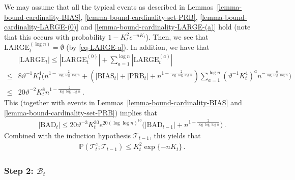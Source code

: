 \documentclass[11pt]{article}
\numberwithin{equation}{section}
\begin{document}
We may assume that all the typical events as described in Lemmas~\ref{lemma-bound-cardinality-BIAS}, \ref{lemma-bound-cardinality-set-PRB}, \ref{lemma-bound-cardinality-LARGE-(0)} and \ref{lemma-bound-cardinality-LARGE-(a)} hold (note that this occurs with probability $1- K_t^2e^{-n K_t}$). Then, we see that $\mathrm{LARGE}_t^{(\log n)} = \emptyset$ (by \eqref{eq-LARGE-a}). In addition, we have that
\begin{align}\label{eq-bound-cardinality-LARGE}
    & |\mathrm{LARGE}_t| \leq |\mathrm{LARGE}^{(0)}_t| + \sum_{a=1}^{\log n} |\mathrm{LARGE}_{t}^{(a)}| \nonumber \\
    \leq & 8 \vartheta^{-1} K_t^4 \big( n^{ 1- \frac{2}{\log \log \log n} } + ( |\mathrm{BIAS}_t| + |\mathrm{PRB}_t| + n^{1-\frac{2}{\log \log \log n}} ) \sum_{a=1}^{\log n} (\vartheta^{-1}K_t^4)^a n^{- \frac{a}{\log \log \log n} } \big) \nonumber \\
    \leq & 20 \vartheta^{-2} K_t^8 n^{1-\frac{2}{\log \log \log n}} \,.
\end{align}
This (together with events in Lemmas~\ref{lemma-bound-cardinality-BIAS} and \ref{lemma-bound-cardinality-set-PRB}) implies that
\begin{align*}
    |\mathrm{BAD}_t| \leq 20 \vartheta^{-3} K_t^{30} e^{20 (\log \log n)^{10}} \big( |\mathrm{BAD}_{t-1}| + n^{1-\frac{2}{\log \log \log n}} \big) \,.
\end{align*}
Combined with the induction hypothesis $\mathcal{T}_{t-1}$, this yields that
\begin{align}
    \mathbb{P}( \mathcal{T}_t^{c}; \mathcal{T}_{t-1} ) \leq K_t^2 \exp\{ - n K_t \} \,.
    \label{equ-prob-mathcal-T-happens}
\end{align}








\subsubsection{Step 2: $\mathcal{B}_{t}$}
\end{document}
